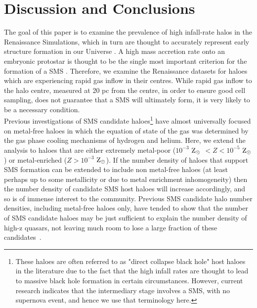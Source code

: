 \documentclass[twocolumn,iop,revtex4]{openjournal}
\newcommand{\zsolar} {$\rm{Z_{\odot}}~$}
\newcommand{\zsolarc} {$\rm{Z_{\odot}}$}
\begin{document}
\section{Discussion and Conclusions} \label{Sec:Discussion}

The goal of this paper is to examine the prevalence of high infall-rate halos in the
Renaissance Simulations, which in turn are thought to accurately represent early structure formation in our Universe \citep{Chen_2014, Xu_2013, Xu_2014, OShea_2015,
  Barrow_2017, Wise_2019}. A high mass accretion rate onto an embryonic protostar is thought to be the
single most important criterion for the formation of a SMS \citep{Hosokawa_2013, Sakurai_2016,
  Woods_2018, Haemmerle_2018}. Therefore, we examine the Renaissance datasets for haloes which are experiencing
rapid gas inflow in their centres. While rapid gas inflow to the halo centre, 
measured at 20 pc from the centre, in order to ensure good cell sampling,
does not guarantee
that a SMS will ultimately form, it is very likely to be a necessary condition. \\
\indent Previous investigations of SMS candidate haloes\footnote{These haloes are often
  referred to as "direct collapse black hole" host haloes in the literature due to the fact
  that the high infall rates are thought to lead to massive black hole formation in certain
  circumstances. However, current research indicates that the intermediary stage involves a
  SMS, with no supernova event, and hence we use that terminology here.} have almost
universally focused on
metal-free haloes in which the equation of state of the gas was determined by the gas phase
cooling mechanisms of hydrogen and helium. Here, we extend the analysis to haloes that are either
extremely metal-poor ($10^{-3}$ \zsolar $< Z < 10^{-5}$ \zsolarc) or metal-enriched ($Z > 10^{-3}$ \zsolarc). If the number density of haloes that support SMS formation
can be extended to include non metal-free haloes (at least perhaps up to some
metallicity or due to metal enrichment inhomogeneity) then the
number density of candidate SMS host haloes will increase accordingly, and so is of
immense interest to the community. 
Previous SMS candidate halo number densities, including metal-free haloes only,
have tended to show that the number of SMS candidate haloes may be just sufficient to explain the number density of high-z quasars,
not leaving much room to lose a large fraction of these candidates~\citep{Agarwal_2012, Visbal_2014b, Agarwal_2015b, Latif_2014a,
  Valiante_2016, Habouzit_2016, Valiante_2017, Habouzit_2017, Regan_2017}. \\
\end{document}

